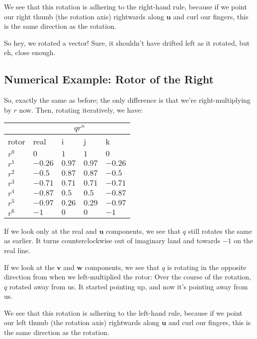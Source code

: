 \documentclass[12pt]{article}
\begin{document}
 	We see that this rotation is adhering to the right-hand rule, because if we point our right thumb (the rotation axis) rightwards along $\mathbf{u}$ and curl our fingers, this is the same direction as the rotation.

	So hey, we rotated a vector! 
 	Sure, it shouldn't have drifted left as it rotated, but eh, close enough.
 	
 	\subsection{Numerical Example: Rotor of the Right}
 	
 	So, exactly the same as before; the only difference is that we're right-multiplying by $r$ now.
 	Then, rotating iteratively, we have:

	\begin{tabular}{|p{1cm} | p{1.1cm} | p{1.1cm} | p{1.1cm} | p{1.1cm}|}
		\hline
		 &  \multicolumn{4}{c}{$q r^n$} \\ 
 		\hline
 		rotor & real & i & j & k\\
 		\hline
 		$r^0$ & $0    $ & $1   $ & $1   $ & $0    $\\ \hline
		$r^1$ & $-0.26$ & $0.97$ & $0.97$ & $-0.26$\\ \hline
		$r^2$ & $-0.5 $ & $0.87$ & $0.87$ & $-0.5 $\\ \hline
		$r^3$ & $-0.71$ & $0.71$ & $0.71$ & $-0.71$\\ \hline
		$r^4$ & $-0.87$ & $0.5 $ & $0.5 $ & $-0.87$\\ \hline
		$r^5$ & $-0.97$ & $0.26$ & $0.29$ & $-0.97$\\ \hline
		$r^6$ & $-1   $ & $0   $ & $0   $ & $-1   $\\ \hline
	\end{tabular}

	If we look only at the real and $\mathbf{u}$ components, we see that $q$ still rotates the same as earlier.
	It turns counterclockwise out of imaginary land and towards $-1$ on the real line.
	
	If we look at the $\mathbf{v}$ and $\mathbf{w}$ components, we see that $q$ is rotating in the opposite direction from when we left-multiplied the rotor:
	Over the course of the rotation, $q$ rotated away from us.
	It started pointing up, and now it's pointing away from us.
	
	We see that this rotation is adhering to the left-hand rule, because if we point our left thumb (the rotation axis) rightwards along $\mathbf{u}$ and curl our fingers, this is the same direction as the rotation.
	
\end{document}
